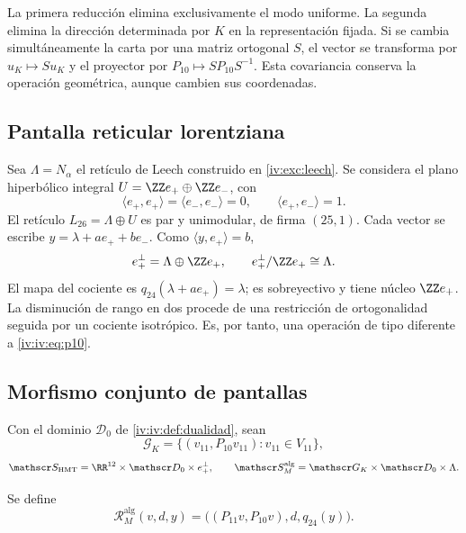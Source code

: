 La primera reducción elimina exclusivamente el modo uniforme.
La segunda elimina la dirección determinada por \(K\) en
la representación fijada. Si se cambia simultáneamente la carta
por una matriz ortogonal \(S\), el vector se transforma por
\(u_K\mapsto Su_K\) y el proyector por
\(P_{10}\mapsto SP_{10}S^{-1}\). Esta covariancia conserva
la operación geométrica, aunque cambien sus coordenadas.

\subsection{Pantalla reticular lorentziana}

Sea \(\Lambda=N_\alpha\) el retículo de Leech construido
en \ref{iv:exc:leech}. Se considera el plano hiperbólico integral
\(U=\ZZ e_+\oplus\ZZ e_-\), con
\[
 \langle e_+,e_+\rangle=\langle e_-,e_-\rangle=0,
 \qquad\langle e_+,e_-\rangle=1.
\]
El retículo \(L_{26}=\Lambda\oplus U\) es par y
unimodular, de firma \((25,1)\). Cada vector se escribe
\(y=\lambda+ae_++be_-\). Como
\(\langle y,e_+\rangle=b\),
\begin{equation}
 e_+^\perp=\Lambda\oplus\ZZ e_+,
 \qquad e_+^\perp/\ZZ e_+\cong\Lambda.
 \label{iv:iv:eq:26-24}
\end{equation}
El mapa del cociente es
\(q_{24}(\lambda+ae_+)=\lambda\); es sobreyectivo y tiene
núcleo \(\ZZ e_+\). La disminución de rango en dos procede
de una restricción de ortogonalidad seguida por un cociente
isotrópico. Es, por tanto, una operación de tipo diferente a
\eqref{iv:iv:eq:p10}.

\subsection{Morfismo conjunto de pantallas}

Con el dominio \(\mathscr D_0\) de \ref{iv:iv:def:dualidad},
sean
\[
 \mathscr G_K=\{(v_{11},P_{10}v_{11}):v_{11}\in V_{11}\},
\]
\[
 \mathscr S_{\mathrm{HMT}}=\RR^{12}\times\mathscr D_0\times e_+^\perp,
 \qquad
 \mathscr S_M^{\mathrm{alg}}=\mathscr G_K\times\mathscr D_0\times\Lambda.
\]
\begin{definition}
\label{iv:iv:def:rm-alg}
Se define
\begin{equation}
 \mathcal R_M^{\mathrm{alg}}(v,d,y)
 =\bigl((P_{11}v,P_{10}v),d,q_{24}(y)\bigr).
 \label{iv:iv:eq:rm-alg}
\end{equation}
\end{definition}

